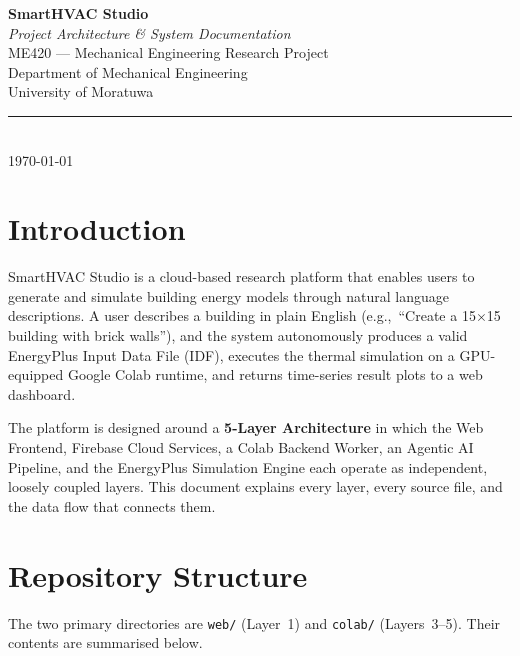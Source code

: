 \documentclass[12pt, a4paper]{article}
\begin{document}
\begin{titlepage}
  \centering
  \vspace*{3cm}
  {\Huge\bfseries SmartHVAC Studio\\[0.4cm]}
  {\Large\itshape Project Architecture \& System Documentation\\[1.5cm]}
  {\large ME420 --- Mechanical Engineering Research Project\\[0.3cm]}
  {\large Department of Mechanical Engineering\\[0.3cm]}
  {\large University of Moratuwa\\[2cm]}
  \rule{0.6\textwidth}{0.4pt}\\[1cm]
  {\large\today}
  \vfill
\end{titlepage}

\tableofcontents
\newpage

\section{Introduction}

SmartHVAC Studio is a cloud-based research platform that enables users to generate and simulate building energy models through natural language descriptions. A user describes a building in plain English (e.g.,\ ``Create a 15$\times$15 building with brick walls''), and the system autonomously produces a valid EnergyPlus Input Data File (IDF), executes the thermal simulation on a GPU-equipped Google Colab runtime, and returns time-series result plots to a web dashboard.

The platform is designed around a \textbf{5-Layer Architecture} in which the Web Frontend, Firebase Cloud Services, a Colab Backend Worker, an Agentic AI Pipeline, and the EnergyPlus Simulation Engine each operate as independent, loosely coupled layers. This document explains every layer, every source file, and the data flow that connects them.

\section{Repository Structure}

The two primary directories are \texttt{web/} (Layer~1) and \texttt{colab/} (Layers~3--5). Their contents are summarised below.
\end{document}
